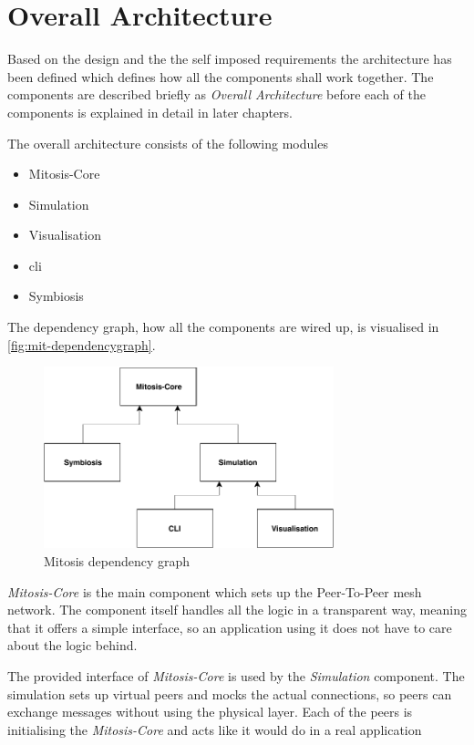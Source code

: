 \section{Overall Architecture}
Based on the design and the the self imposed requirements the architecture has been defined which defines how all the components shall work together.
The components are described briefly as \textit{Overall Architecture} before each of the components is explained in detail in later chapters.

The overall architecture consists of the following modules
\begin{itemize}
    \item Mitosis-Core
    \item Simulation
    \item Visualisation
    \item \gls{cli}
    \item Symbiosis
\end{itemize}

The dependency graph, how all the components are wired up, is visualised in \vref{fig:mit-dependencygraph}.

\begin{figure}
\centering
\includegraphics[width=0.75\textwidth]{graphics/implementation/overall-architecture.pdf}
\caption{Mitosis dependency graph}
\label{fig:mit-dependencygraph}
\end{figure}

\textit{Mitosis-Core} is the main component which sets up the Peer-To-Peer mesh network. The component itself handles all the logic in a transparent way, meaning that it offers a simple interface, so an application using it does not have to care about the logic behind.

The provided interface of \textit{Mitosis-Core} is used by the \textit{Simulation} component. The simulation sets up virtual peers and mocks the actual connections, so peers can exchange messages without using the physical layer. Each of the peers is initialising the \textit{Mitosis-Core} and acts like it would do in a real application

